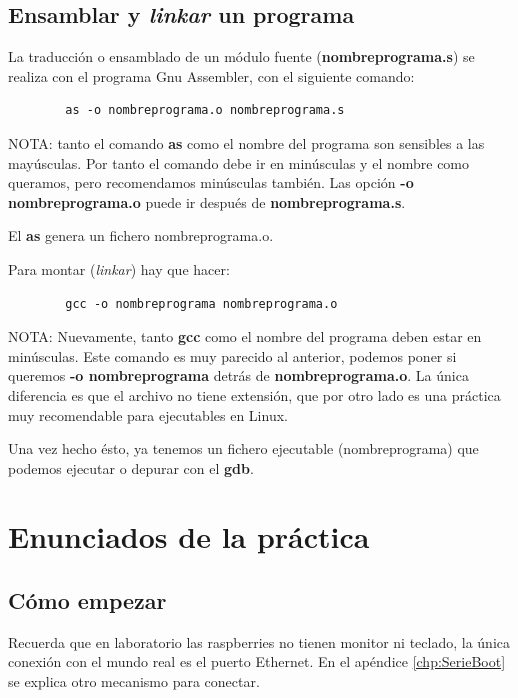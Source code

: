 \subsection{Ensamblar y {\it linkar} un programa}

La traducción o ensamblado de un módulo fuente ({\bf nombreprograma.s})
se realiza con el programa Gnu Assembler, con el siguiente comando:

\begin{lstlisting}
        as -o nombreprograma.o nombreprograma.s
\end{lstlisting}

NOTA: tanto el comando {\bf as} como el nombre del programa son sensibles
a las mayúsculas. Por tanto el comando debe ir en minúsculas y el nombre
como queramos, pero recomendamos minúsculas también.
Las opción {\bf -o nombreprograma.o} puede ir después de {\bf nombreprograma.s}.

El {\bf as} genera un fichero nombreprograma.o.

Para montar ({\it linkar}) hay que hacer:

\begin{lstlisting}
        gcc -o nombreprograma nombreprograma.o
\end{lstlisting}

NOTA: Nuevamente, tanto {\bf gcc} como el nombre del programa deben estar
en minúsculas. Este comando es muy parecido al anterior, podemos poner si
queremos {\bf -o nombreprograma} detrás de {\bf nombreprograma.o}. La única
diferencia es que el archivo no tiene extensión, que por otro lado es una
práctica muy recomendable para ejecutables en Linux.

Una vez hecho ésto, ya tenemos un fichero ejecutable (nombreprograma) que
podemos ejecutar o depurar con el {\bf gdb}.

\section{Enunciados de la práctica}

\subsection{Cómo empezar}

Recuerda que en laboratorio las raspberries no tienen
monitor ni teclado, la única conexión con el mundo real
es el puerto Ethernet. En el apéndice \ref{chp:SerieBoot} se
explica otro mecanismo para conectar.

